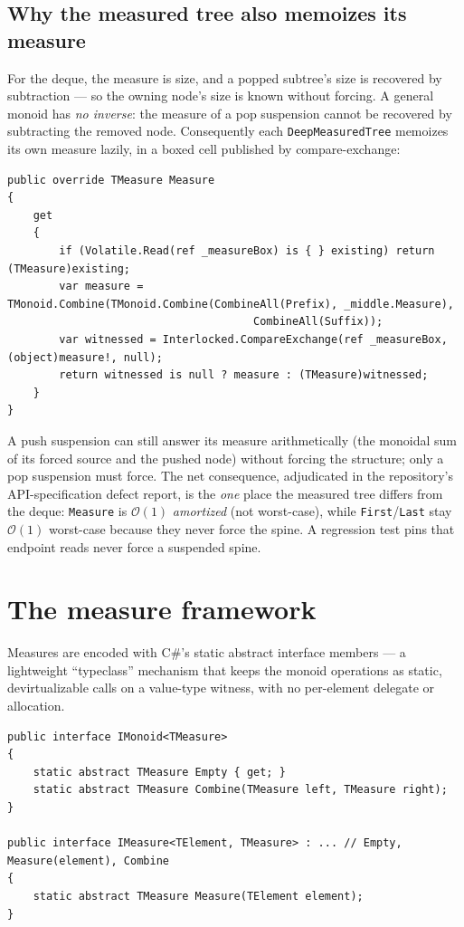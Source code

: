 \documentclass[11pt]{article}
\newcommand{\cs}[1]{\lstinline|#1|}
\newcommand{\bigO}{\ensuremath{\mathcal{O}}}
\begin{document}
\subsection{Why the measured tree also memoizes its measure}

For the deque, the measure is size, and a popped subtree's size is recovered by subtraction --- so the
owning node's size is known without forcing. A general monoid has \emph{no inverse}: the measure of a
pop suspension cannot be recovered by subtracting the removed node. Consequently each
\cs{DeepMeasuredTree} memoizes its own measure lazily, in a boxed cell published by compare-exchange:

\begin{lstlisting}
public override TMeasure Measure
{
    get
    {
        if (Volatile.Read(ref _measureBox) is { } existing) return (TMeasure)existing;
        var measure = TMonoid.Combine(TMonoid.Combine(CombineAll(Prefix), _middle.Measure),
                                      CombineAll(Suffix));
        var witnessed = Interlocked.CompareExchange(ref _measureBox, (object)measure!, null);
        return witnessed is null ? measure : (TMeasure)witnessed;
    }
}
\end{lstlisting}

A push suspension can still answer its measure arithmetically (the monoidal sum of its forced source and
the pushed node) without forcing the structure; only a pop suspension must force. The net consequence,
adjudicated in the repository's API-specification defect report, is the \emph{one} place the measured
tree differs from the deque: \cs{Measure} is $\bigO(1)$ \emph{amortized} (not worst-case), while
\cs{First}/\cs{Last} stay $\bigO(1)$ worst-case because they never force the spine. A regression test
pins that endpoint reads never force a suspended spine.

\section{The measure framework}
\label{sec:measures}

Measures are encoded with C\#'s static abstract interface members --- a lightweight ``typeclass''
mechanism that keeps the monoid operations as static, devirtualizable calls on a value-type witness, with
no per-element delegate or allocation.

\begin{lstlisting}
public interface IMonoid<TMeasure>
{
    static abstract TMeasure Empty { get; }
    static abstract TMeasure Combine(TMeasure left, TMeasure right);
}

public interface IMeasure<TElement, TMeasure> : ... // Empty, Measure(element), Combine
{
    static abstract TMeasure Measure(TElement element);
}
\end{lstlisting}
\end{document}
